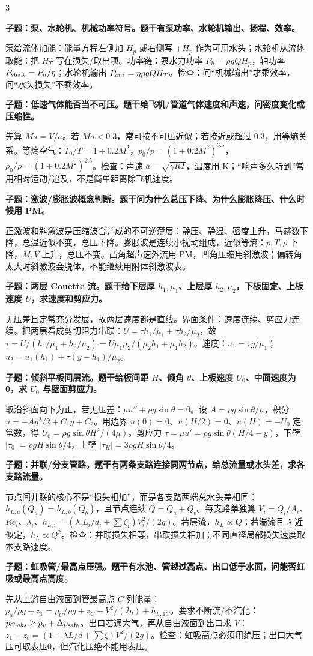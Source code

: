 \documentclass[a4paper]{article}
\newcommand{\qt}[1]{\vspace{0.10pt}\colorbox{Q}{\parbox{\dimexpr\linewidth-2\fboxsep}{\color{white}\bfseries #1}}\par}
\newcommand{\ans}[1]{\colorbox{G}{\parbox{\dimexpr\linewidth-2\fboxsep}{#1}}\par}
\begin{document}
\begin{multicols}{3}
\qt{子题：泵、水轮机、机械功率符号。题干有泵功率、水轮机输出、扬程、效率。}
\ans{泵给流体加能：能量方程左侧加 $H_p$ 或右侧写 $+H_p$ 作为可用水头；水轮机从流体取能：把 $H_T$ 写在损失/取出项。功率链：泵水力功率 $P_h=\rho gQH_p$，轴功率 $P_{\rm shaft}=P_h/\eta$；水轮机输出 $P_{\rm out}=\eta\rho gQH_T$。检查：问“机械输出”才乘效率，问“水头损失”不乘效率。}
\qt{子题：低速气体能否当不可压。题干给飞机/管道气体速度和声速，问密度变化或压缩性。}
\ans{先算 $Ma=V/a$。若 $Ma<0.3$，常可按不可压近似；若接近或超过 0.3，用等熵关系。等熵空气：$T_0/T=1+0.2M^2$，$p_0/p=(1+0.2M^2)^{3.5}$，$\rho_0/\rho=(1+0.2M^2)^{2.5}$。检查：声速 $a=\sqrt{\gamma RT}$，温度用 K；“响声多久听到”常用相对运动/追及，不是简单距离除飞机速度。}
\qt{子题：激波/膨胀波概念判断。题干问为什么总压下降、为什么膨胀降压、什么时候用 PM。}
\ans{正激波和斜激波是压缩波合并成的不可逆薄层：静压、静温、密度上升，马赫数下降，总温近似不变，总压下降。膨胀波是连续小扰动组成，近似等熵：$p,T,\rho$ 下降，$M,V$ 上升，总压不变。凸角超声速外流用 PM，凹角压缩用斜激波；偏转角太大时斜激波会脱体，不能继续用附体斜激波表。}
\qt{子题：两层 Couette 流。题干给下层厚 $h_1,\mu_1$、上层厚 $h_2,\mu_2$，下板固定、上板速度 $U$，求速度和剪应力。}
\ans{无压差且定常充分发展，故两层速度都是直线。界面条件：速度连续、剪应力连续。把两层看成剪切阻力串联：$U=\tau h_1/\mu_1+\tau h_2/\mu_2$，故 $\tau=U/(h_1/\mu_1+h_2/\mu_2)=U\mu_1\mu_2/(\mu_2h_1+\mu_1h_2)$。速度：$u_1=\tau y/\mu_1$；$u_2=u_1(h_1)+\tau(y-h_1)/\mu_2$。}
\qt{子题：倾斜平板间层流。题干给板间距 $H$、倾角 $\theta$、上板速度 $U_0$、中面速度为0，求 $U_0$ 与壁面剪应力。}
\ans{取沿斜面向下为正，若无压差：$\mu u''+\rho g\sin\theta=0$。设 $A=\rho g\sin\theta/\mu$，积分 $u=-Ay^2/2+C_1y+C_2$。用边界 $u(0)=0$、$u(H/2)=0$、$u(H)=-U_0$ 定常数，得 $U_0=\rho g\sin\theta H^2/(4\mu)$。剪应力 $\tau=\mu u'=\rho g\sin\theta(H/4-y)$，下壁 $|\tau_0|=\rho gH\sin\theta/4$，上壁 $|\tau_H|=3\rho gH\sin\theta/4$。}
\qt{子题：并联/分支管路。题干有两条支路连接同两节点，给总流量或水头差，求各支路流量。}
\ans{节点间并联的核心不是“损失相加”，而是各支路两端总水头差相同：$h_{L,a}(Q_a)=h_{L,b}(Q_b)$，且节点连续 $Q=Q_a+Q_b$。每支路单独算 $V_i=Q_i/A_i$、$Re_i$、$\lambda_i$、$h_{L,i}=(\lambda_iL_i/d_i+\sum\zeta_i)V_i^2/(2g)$。若层流，$h_L\propto Q$；若湍流且 $\lambda$ 近似定，$h_L\propto Q^2$。检查：并联损失相等，串联损失相加；不同直径局部损失速度取本支路速度。}
\qt{子题：虹吸管/最高点压强。题干有水池、管越过高点、出口低于水面，问能否虹吸或最高点高度。}
\ans{先从上游自由液面到管最高点 $C$ 列能量：$p_a/\rho g+z_1=p_C/\rho g+z_C+V^2/(2g)+h_{L,1C}$。要求不断流/不汽化：$p_{C,abs}\ge p_v+\Delta p_{\rm safe}$。出口若通大气，再从自由液面到出口求 $V$：$z_1-z_e=(1+\lambda L/d+\sum\zeta)V^2/(2g)$。检查：虹吸高点必须用绝压；出口大气压可取表压0，但汽化压绝不能用表压。}

\end{multicols}
\end{document}
